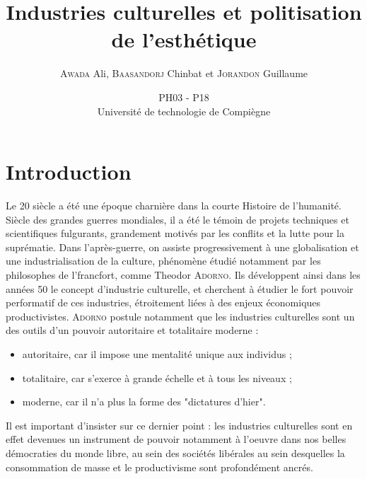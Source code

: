 \documentclass[a4paper,12pt]{report}
\title{Industries culturelles et politisation de l'esthétique}
\author{\textsc{Awada} Ali, \textsc{Baasandorj} Chinbat et \textsc{Jorandon} Guillaume}
\date{PH03 - P18\\ Université de technologie de Compiègne\\\vspace{1cm}}
\begin{document}
\maketitle

\tableofcontents

\chapter*{Introduction}

Le 20 siècle a été une époque charnière dans la courte Histoire de l'humanité. Siècle des grandes guerres mondiales, il a été le témoin de projets techniques et scientifiques fulgurants, grandement motivés par les conflits et la lutte pour la suprématie. Dans l'après-guerre, on assiste progressivement à une globalisation et une industrialisation de la culture, phénomène étudié notamment par les philosophes de l'\gls{francfort}, comme Theodor \textsc{Adorno}. Ils développent ainsi dans les années 50 le concept d'industrie culturelle, et cherchent à étudier le fort pouvoir performatif de ces industries, étroitement liées à des enjeux économiques productivistes. \textsc{Adorno} postule notamment que les industries culturelles sont un des outils d'un pouvoir autoritaire et totalitaire moderne :

\begin{itemize}
    \item{autoritaire, car il impose une mentalité unique aux individus ;}
    \item{totalitaire, car s'exerce à grande échelle et à tous les niveaux ;}
    \item{moderne, car il n'a plus la forme des "dictatures d'hier".}
\end{itemize}

Il est important d'insister sur ce dernier point : les industries culturelles sont en effet devenues un instrument de pouvoir notamment à l'oeuvre dans nos belles démocraties du monde libre, au sein des sociétés libérales au sein desquelles la consommation de masse et le productivisme sont profondément ancrés.
\end{document}

